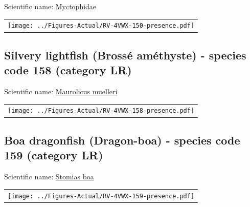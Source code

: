 \documentclass[12pt]{article}\usepackage[]{graphicx}\usepackage[]{color}
\begin{document}
Scientific name: \href{http://www.marinespecies.org/aphia.php?p=taxdetails\&id=125498}{Myctophidae} \newline
\begin{minipage}{1.0\textwidth}
 \begin{tabular}{c}
\texttt{[image: ../Figures-Actual/RV-4VWX-150-presence.pdf]} \\ 
\end{tabular} 
\end{minipage}
\clearpage

\renewcommand\thefigure{\thesubsection\Alph{figure}}

\setcounter{figure}{0}

\hypertarget{sec:158}{%
\subsection{Silvery lightfish (Brossé améthyste) - species code 158 (category LR)}\label{sec:158}}

  


Scientific name: \href{http://www.marinespecies.org/aphia.php?p=taxdetails\&id=127312}{Maurolicus muelleri} \newline
\begin{minipage}{1.0\textwidth}
 \begin{tabular}{c}
\texttt{[image: ../Figures-Actual/RV-4VWX-158-presence.pdf]} \\ 
\end{tabular} 
\end{minipage}
\clearpage

\renewcommand\thefigure{\thesubsection\Alph{figure}}

\setcounter{figure}{0}

\hypertarget{sec:159}{%
\subsection{Boa dragonfish (Dragon-boa) - species code 159 (category LR)}\label{sec:159}}

  


Scientific name: \href{http://www.marinespecies.org/aphia.php?p=taxdetails\&id=127374}{Stomias boa} \newline
\begin{minipage}{1.0\textwidth}
 \begin{tabular}{c}
\texttt{[image: ../Figures-Actual/RV-4VWX-159-presence.pdf]} \\ 
\end{tabular} 
\end{minipage}
\clearpage
\end{document}
